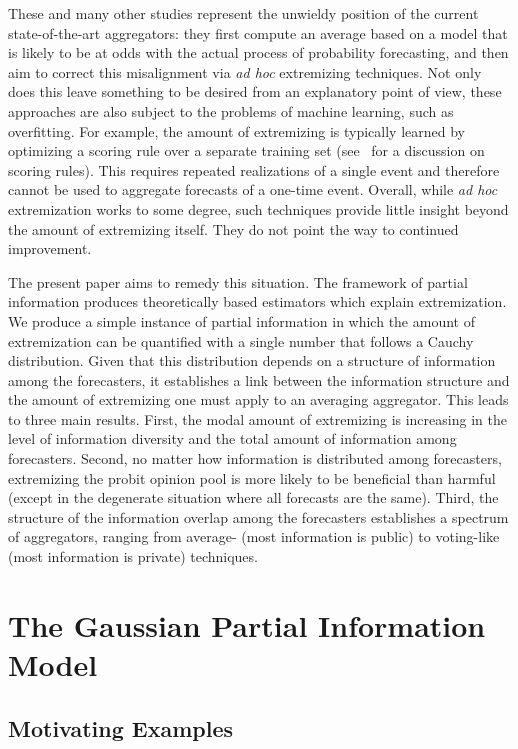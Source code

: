 \documentclass[11pt]{article}
\theoremstyle{definition}
\theoremstyle{definition}
\begin{document}
These and many other studies represent the unwieldy position of the
 current state-of-the-art aggregators: they first compute an average 
 based on a model that is
likely to be at odds with the actual process of probability
forecasting, and  then aim to correct this misalignment via {\em ad hoc}
extremizing techniques.
%
Not only does this leave something to be desired from an explanatory
point of view, these approaches are also subject to the problems of
machine learning, such as overfitting.  For example, the amount of 
extremizing is typically learned by optimizing a
scoring rule over a separate training set
(see~\citealt{Gneiting04strictlyproper} for a discussion on scoring
rules).  This requires repeated realizations
of a single event and therefore cannot be used to aggregate forecasts
 of a one-time event. Overall, while {\em ad hoc}
extremization works to some degree, such techniques provide little
insight beyond the amount of extremizing itself.  They do not point
the way to continued improvement.

The present paper aims to remedy this situation.  The framework of
partial information produces theoretically based estimators which
explain extremization.  We produce a simple instance of partial
information in which the amount of extremization can be quantified
with a single number that follows a Cauchy distribution.  Given that
this distribution depends on a structure of information among the
forecasters, it establishes a link between the information structure
and the amount of extremizing one must apply to an averaging
aggregator.  This leads to three main results.  First, the modal
amount of extremizing is increasing in the level of information
diversity and the total amount of information among forecasters.
Second, no matter how information is distributed among forecasters,
extremizing the probit opinion pool is more likely to be beneficial
than harmful (except in the degenerate situation where all forecasts
are the same). Third, the structure of the information overlap among
the forecasters establishes a spectrum of aggregators, ranging from
average- (most information is public) to voting-like (most information
is private) techniques.


\section{The Gaussian Partial Information Model}
\label{sec:model}

\subsection{Motivating Examples}
\end{document}
